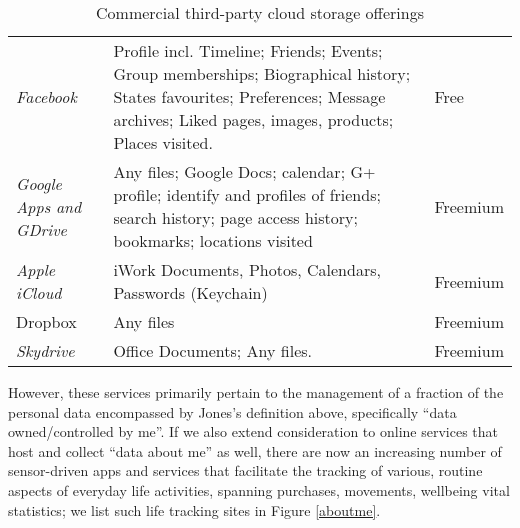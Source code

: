 \documentclass[graybox]{svmult}
\begin{document}
\begin{table}
\begin{tabular}{p{2.2cm} p{8cm} l}

\emph{Facebook} & Profile incl. Timeline; Friends; Events; Group memberships; Biographical history; States favourites; Preferences; Message archives; Liked pages, images, products; Places visited. & Free \\

\emph{Google Apps and GDrive} & Any files; Google Docs; calendar; G+ profile; identify and profiles of friends; search history; page access history; bookmarks; locations visited & Freemium\\

\emph{Apple iCloud} & iWork Documents, Photos, Calendars, Passwords (Keychain) & Freemium \\
Dropbox & Any files & Freemium \\

\emph{Skydrive} & Office Documents; Any files. & Freemium \\

\end{tabular}
\caption{Commercial third-party cloud storage offerings}
\label{fig:cloudstorage}
\end{table}

However, these services primarily pertain to the management of a fraction of the personal data encompassed by Jones's definition above, specifically ``data owned/controlled by me''.  If we also extend consideration to online services that host and collect ``data about me'' as well, there are now an increasing number of sensor-driven apps and services that facilitate the tracking of various, routine aspects of everyday life activities, spanning purchases, movements, wellbeing vital statistics; we list such life tracking sites in Figure \ref{aboutme}.
\end{document}
